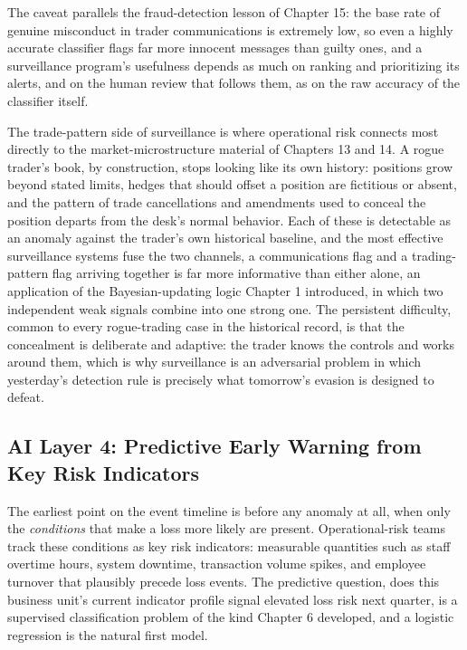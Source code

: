 \documentclass[../ai_in_finance]{subfiles}
\begin{document}
The caveat parallels the fraud-detection lesson of Chapter 15: the base rate of genuine misconduct in trader communications is extremely low, so even a highly accurate classifier flags far more innocent messages than guilty ones, and a surveillance program's usefulness depends as much on ranking and prioritizing its alerts, and on the human review that follows them, as on the raw accuracy of the classifier itself.

The trade-pattern side of surveillance is where operational risk connects most directly to the market-microstructure material of Chapters 13 and 14. A rogue trader's book, by construction, stops looking like its own history: positions grow beyond stated limits, hedges that should offset a position are fictitious or absent, and the pattern of trade cancellations and amendments used to conceal the position departs from the desk's normal behavior. Each of these is detectable as an anomaly against the trader's own historical baseline, and the most effective surveillance systems fuse the two channels, a communications flag and a trading-pattern flag arriving together is far more informative than either alone, an application of the Bayesian-updating logic Chapter 1 introduced, in which two independent weak signals combine into one strong one. The persistent difficulty, common to every rogue-trading case in the historical record, is that the concealment is deliberate and adaptive: the trader knows the controls and works around them, which is why surveillance is an adversarial problem in which yesterday's detection rule is precisely what tomorrow's evasion is designed to defeat.

\subsection{AI Layer 4: Predictive Early Warning from Key Risk Indicators}
\label{sec:oprisk-kri}

The earliest point on the event timeline is before any anomaly at all, when only the \emph{conditions} that make a loss more likely are present. Operational-risk teams track these conditions as key risk indicators: measurable quantities such as staff overtime hours, system downtime, transaction volume spikes, and employee turnover that plausibly precede loss events. The predictive question, does this business unit's current indicator profile signal elevated loss risk next quarter, is a supervised classification problem of the kind Chapter 6 developed, and a logistic regression is the natural first model.
\end{document}
